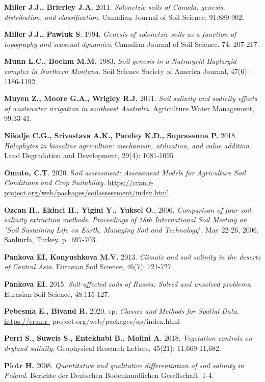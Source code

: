 \documentclass[
  10pt,
  b5paper,
]{book}
\begin{document}
\textbf{Miller J.J., Brierley J.A.} 2011. \emph{Solonetzic soils of Canada: genesis, distribution, and classification}. Canadian Journal of Soil Science, 91:889-902.

\textbf{Miller J.J., Pawluk S}. 1994. \emph{Genesis of solonetzic soils as a function of topography and seasonal dynamics}. Canadian Journal of Soil Science, 74: 207-217.

\textbf{Munn L.C., Boehm M.M.} 1983. \emph{Soil genesis in a Natrargrid-Haplargid complex in Northern Montana}. Soil Science Society of America Journal, 47(6): 1186-1192.

\textbf{Muyen Z., Moore G.A., Wrigley R.J.} 2011. \emph{Soil salinity and sodicity effects of wastewater irrigation in southeast Australia}. Agriculture Water Management, 99:33-41.

\textbf{Nikalje C.G., Srivastava A.K., Pandey K.D., Suprasanna P.} 2018. \emph{Halophytes in biosaline agriculture: mechanism, utilization, and value addition}. Land Degradation and Development, 29(4): 1081-1095

\textbf{Omuto, C.T}. 2020. S\emph{oil assessment: Assessment Models for Agriculture Soil Conditions and Crop Suitability}. \url{https://cran.r-project.org/web/packages/soilassessment/index.html}

\textbf{Ozcan H., Ekinci H., Yigini Y., Yuksel O}., 2006. \emph{Comparison of four soil salinity extraction methods. Proceedings of 18th International Soil Meeting on "Soil Sustaining Life on Earth, Managing Soil and Technology}", May 22-26, 2006, Sanliurfa, Turkey, p.~697-703.

\textbf{Pankova EI, Konyushkova M.V.} 2013. \emph{Climate and soil salinity in the deserts of Central Asia}. Eurasian Soil Science, 46(7): 721-727.

\textbf{Pankova EI.} 2015. \emph{Salt-affected soils of Russia: Solved and unsolved problems}. Eurasian Soil Science, 48:115-127.

\textbf{Pebesma E., Bivand R.} 2020. sp: \emph{Classes and Methods for Spatial Data}. \url{https://cran.r-} project.org/web/packages/sp/index.html

\textbf{Perri S., Suweis S., Entekhabi B., Molini A.} 2018. \emph{Vegetation controls on dryland salinity}. Geophysical Research Letters, 45(21): 11,669-11,682.

\textbf{Piotr H.} 2008. \emph{Quantitative and qualitative differentiation of soil salinity in Poland}. Berichte der Deutschen Bodenkundlichen Gesellschaft. 1-4.
\end{document}
